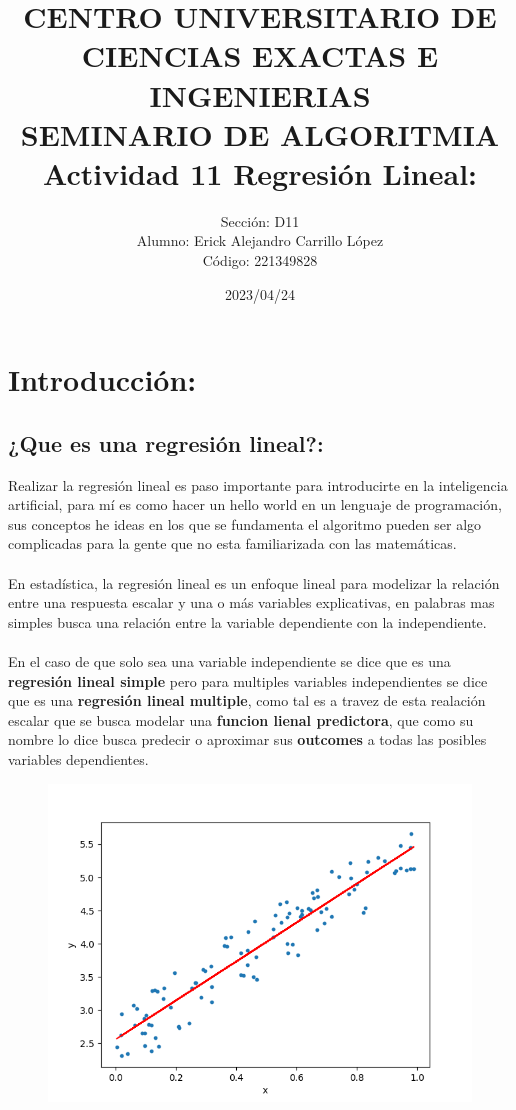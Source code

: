 \documentclass[12pt, letterpaper]{article}
\title{CENTRO UNIVERSITARIO DE CIENCIAS EXACTAS E INGENIERIAS\\
  SEMINARIO DE ALGORITMIA\\
  \textbf{Actividad 11 Regresión Lineal:}}
\author{Sección: D11\\
  Alumno: Erick Alejandro Carrillo López\\
  Código: 221349828}
\date{2023/04/24}
\begin{document}
\maketitle
\tableofcontents
\newpage
\section{Introducción:}
\subsection{¿Que es una regresión lineal?:}
Realizar la regresión lineal es paso importante para introducirte en la inteligencia artificial, para
mí es como hacer un hello world en un lenguaje de programación, sus conceptos he ideas en los que se fundamenta
el algoritmo pueden ser algo 
complicadas para la gente que no esta familiarizada con las matemáticas.\\\\
En estadística, la regresión lineal es un enfoque lineal para modelizar la
relación entre una respuesta escalar y una o más variables explicativas, en palabras mas simples
busca una relación entre la variable dependiente con la independiente.\\\\
En el caso de que solo sea una variable independiente se dice que es una \textbf{regresión lineal simple}
pero para multiples variables independientes se dice que es una \textbf{regresión lineal multiple},
como tal es a travez de esta realación escalar que se busca modelar una \textbf{funcion lienal predictora},
que como su nombre lo dice busca predecir o aproximar sus \textbf{outcomes} a todas las
posibles variables dependientes.

\begin{figure}[H]
  \centering
  \includegraphics[scale = 0.5]{regression.png}
\end{figure}
\end{document}
